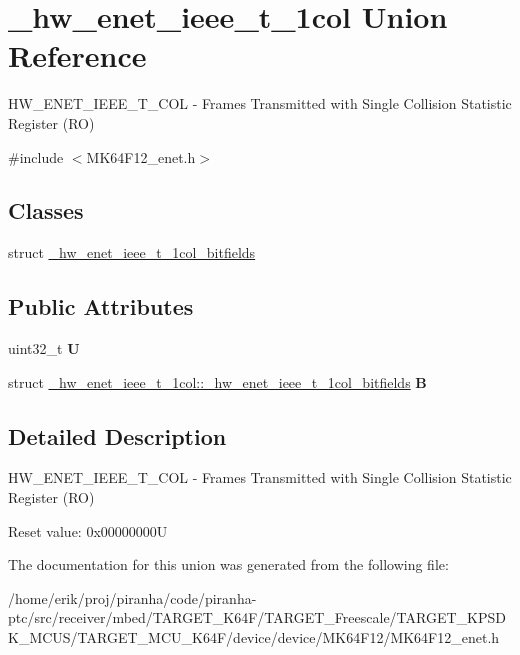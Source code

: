 \hypertarget{union__hw__enet__ieee__t__1col}{}\section{\+\_\+hw\+\_\+enet\+\_\+ieee\+\_\+t\+\_\+1col Union Reference}
\label{union__hw__enet__ieee__t__1col}


H\+W\+\_\+\+E\+N\+E\+T\+\_\+\+I\+E\+E\+E\+\_\+\+T\+\_\+C\+OL -\/ Frames Transmitted with Single Collision Statistic Register (RO)  




{\ttfamily \#include $<$M\+K64\+F12\+\_\+enet.\+h$>$}

\subsection*{Classes}
\begin{DoxyCompactItemize}
\item 
struct \hyperlink{struct__hw__enet__ieee__t__1col_1_1__hw__enet__ieee__t__1col__bitfields}{\+\_\+hw\+\_\+enet\+\_\+ieee\+\_\+t\+\_\+1col\+\_\+bitfields}
\end{DoxyCompactItemize}
\subsection*{Public Attributes}
\begin{DoxyCompactItemize}
\item 
uint32\+\_\+t {\bfseries U}\hypertarget{union__hw__enet__ieee__t__1col_a94a89e385b0474c4cb2892b2e2044ee6}{}\label{union__hw__enet__ieee__t__1col_a94a89e385b0474c4cb2892b2e2044ee6}

\item 
struct \hyperlink{struct__hw__enet__ieee__t__1col_1_1__hw__enet__ieee__t__1col__bitfields}{\+\_\+hw\+\_\+enet\+\_\+ieee\+\_\+t\+\_\+1col\+::\+\_\+hw\+\_\+enet\+\_\+ieee\+\_\+t\+\_\+1col\+\_\+bitfields} {\bfseries B}\hypertarget{union__hw__enet__ieee__t__1col_a2d43503343e4840f2e20818419904532}{}\label{union__hw__enet__ieee__t__1col_a2d43503343e4840f2e20818419904532}

\end{DoxyCompactItemize}


\subsection{Detailed Description}
H\+W\+\_\+\+E\+N\+E\+T\+\_\+\+I\+E\+E\+E\+\_\+\+T\+\_\+C\+OL -\/ Frames Transmitted with Single Collision Statistic Register (RO) 

Reset value\+: 0x00000000U 

The documentation for this union was generated from the following file\+:\begin{DoxyCompactItemize}
\item 
/home/erik/proj/piranha/code/piranha-\/ptc/src/receiver/mbed/\+T\+A\+R\+G\+E\+T\+\_\+\+K64\+F/\+T\+A\+R\+G\+E\+T\+\_\+\+Freescale/\+T\+A\+R\+G\+E\+T\+\_\+\+K\+P\+S\+D\+K\+\_\+\+M\+C\+U\+S/\+T\+A\+R\+G\+E\+T\+\_\+\+M\+C\+U\+\_\+\+K64\+F/device/device/\+M\+K64\+F12/M\+K64\+F12\+\_\+enet.\+h\end{DoxyCompactItemize}
